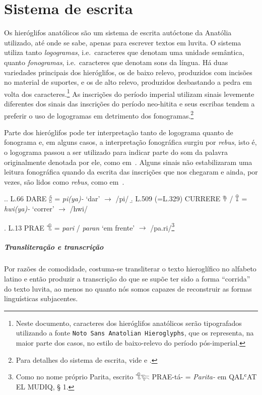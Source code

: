 
\chapter{Sistema de escrita}

Os hieróglifos anatólicos são um sistema de escrita autóctone da Anatólia
utilizado, até onde se sabe, apenas para escrever textos em luvita.
O sistema utiliza tanto \emph{logogramas}, i.e.\ caracteres que denotam uma
unidade semântica, quanto \emph{fonogramas}, i.e.\ caracteres que denotam sons da
língua.
Há duas variedades principais dos hieróglifos, os de baixo relevo, produzidos
com incisões no material de suportes, e os de alto relevo, produzidos
desbastando a pedra em volta dos caracteres.\footnote{Neste documento,
	caracteres dos hieróglifos anatólicos serão tipografados utilizando a fonte
		{\tiny\texttt{Noto Sans Anatolian Hieroglyphs}}, que os representa, na
	maior parte dos casos, no estilo de
	baixo-relevo do período pós\hyp{}imperial.}
As inscrições do período imperial utilizam sinais levemente diferentes dos
sinais das inscrições do período neo-hitita e seus escribas tendem a preferir
o uso de logogramas em detrimento dos fonogramas.\footnote{%
	Para detalhes do sistema de escrita, vide
	\citet[pp.\ 6ff.\ e pp.\ 23ff.]{CHLI11} e \citet[pp. 354ff.]{CHLI3}.
}


Parte dos hieróglifos pode ter interpretação tanto de logograma quanto de
fonograma e, em alguns casos, a interpretação fonográfica surgiu por
\emph{rebus}, isto é, o logograma passou a ser utilizado para indicar parte do
som da palavra originalmente denotada por ele, como em~\Next.
Alguns sinais não estabilizaram uma leitura fonográfica quando da escrita das
inscrições que nos chegaram e ainda, por vezes, são lidos como \emph{rebus},
como em~\NNext.

\ex.\a. L.66 DARE 𔑈 = \emph{pi{(ya)}-} `dar' $\rightarrow$ /pi/
\b. L.509 (=L.329) CURRERE 𔘰 \slash{} 𔕰 = \emph{hwi{(ya)}-} `correr' $\rightarrow$
/hwi/

\ex. L.13 PRAE 𔐎 = \emph{pari} \slash{} \emph{paran} `em frente' $\rightarrow$
/pa.ri/\footnote{Como no nome próprio Parita, escrito 𔐎𔐞 PRAE-tá- =
	\emph{Parita-} em QALʿAT EL MUDIQ, § 1.}

\paragraph{Transliteração e transcrição}
Por razões de comodidade, costuma-se transliterar o texto hieroglífico no
alfabeto latino e então produzir a transcrição do que se supõe ter sido a
forma ``corrida'' do texto luvita, ao menos no quanto nós somos capazes de
reconstruir as formas linguísticas subjacentes.


